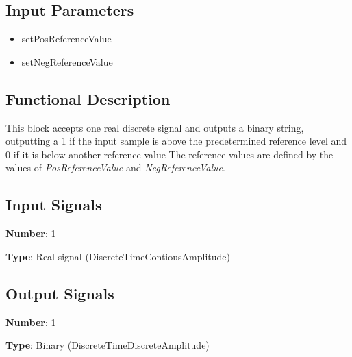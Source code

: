 \documentclass[../../sdf/tex/BPSK_system.tex]{subfiles}
\date{ }
\begin{document}
\onlyinsubfile{\maketitle}

\subsection*{Input Parameters}

\begin{multicols}{2}
	\begin{itemize}
		\item setPosReferenceValue
		\item setNegReferenceValue
	\end{itemize}
\end{multicols}

\subsection*{Functional Description}

This block accepts one real discrete signal and outputs a binary string, outputting a 1 if the input sample is above the predetermined reference level and 0 if it is below another reference value The reference values are defined by the values of \textit{PosReferenceValue} and \textit{NegReferenceValue}.

\subsection*{Input Signals}

\textbf{Number}: 1

\textbf{Type}: Real signal (DiscreteTimeContiousAmplitude)

\subsection*{Output Signals}

\textbf{Number}: 1

\textbf{Type}: Binary (DiscreteTimeDiscreteAmplitude)
\end{document}
